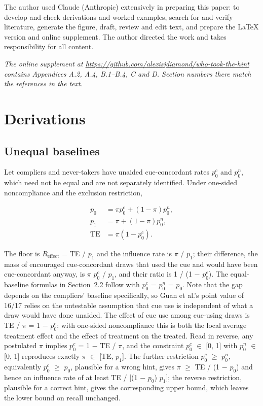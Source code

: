 \documentclass[11pt,a4paper]{article}
\begin{document}
\begin{aespubliconly}
The author used Claude (Anthropic) extensively in preparing this paper: to develop and check derivations and worked examples, search for and verify literature, generate the figure, draft, review and edit text, and prepare the LaTeX version and online supplement. The author directed the work and takes responsibility for all content.
\end{aespubliconly}




\appendix
\emph{The online supplement at \mbox{\url{https://github.com/alexisjdiamond/who-took-the-hint}} contains Appendices A.2, A.4, B.1–B.4, C and D. Section numbers there match the references in the text.}

\setcounter{section}{0}
\section{Derivations}
\setcounter{subsection}{0}
\subsection{Unequal baselines}
Let compliers and never-takers have unaided cue-concordant rates $p_0^{c}$ and $p_0^{n}$, which need not be equal and are not separately identified. Under one-sided noncompliance and the exclusion restriction,

\begin{align*}
  p_0 &= \pi  p_0^{c} + (1 - \pi ) p_0^{n}, \\
  p_1 &= \pi  + (1 - \pi ) p_0^{n}, \\
  \mathrm{TE} &= \pi  (1 - p_0^{c}).
\end{align*}

The floor is $R_{\mathrm{effect}}$ = TE / $p_1$ and the influence rate is $\pi$ / $p_1$; their difference, the mass of encouraged cue-concordant draws that used the cue and would have been cue-concordant anyway, is $\pi$ $p_0^{c}$ / $p_1$, and their ratio is 1 / (1 $-$ $p_0^{c}$). The equal-baseline formulas in Section~2.2 follow with $p_0^{c}$ = $p_0^{n}$ = $p_0$. Note that the gap depends on the compliers’ baseline specifically, so Guan et al.’s point value of 16/17 relies on the untestable assumption that cue use is independent of what a draw would have done unaided. The effect of cue use among cue-using draws is TE / $\pi$ = 1 $-$ $p_0^{c}$; with one-sided noncompliance this is both the local average treatment effect and the effect of treatment on the treated. Read in reverse, any postulated $\pi$ implies $p_0^{c}$ = 1 $-$ TE / $\pi$, and the constraint $p_0^{c}$ $\in$ [0, 1] with $p_0^{n}$ $\in$ [0, 1] reproduces exactly $\pi$ $\in$ [TE, $p_1$]. The further restriction $p_0^{c}$ $\geq$ $p_0^{n}$, equivalently $p_0^{c}$ $\geq$ $p_0$, plausible for a wrong hint, gives $\pi$ $\geq$ TE / (1 $-$ $p_0$) and hence an influence rate of at least TE / [(1 $-$ $p_0$) $p_1$]; the reverse restriction, plausible for a correct hint, gives the corresponding upper bound, which leaves the lower bound on recall unchanged.
\end{document}
